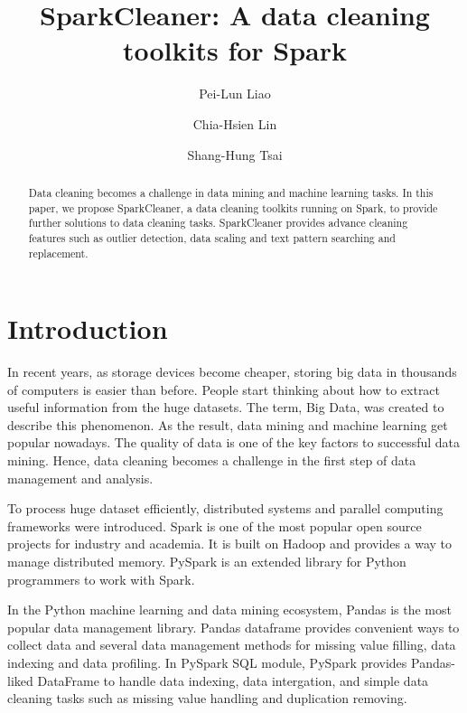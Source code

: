 \documentclass[sigconf]{acmart}
\begin{document}
\title{SparkCleaner: A data cleaning toolkits for Spark}

\author{Pei-Lun Liao}

\author{Chia-Hsien Lin}

\author{Shang-Hung Tsai}

\begin{abstract}
Data cleaning becomes a challenge in data mining and machine learning tasks. In this paper, we propose SparkCleaner, a data cleaning toolkits running on Spark, to provide further solutions to data cleaning tasks. SparkCleaner provides advance cleaning features such as outlier detection, data scaling and text pattern searching and replacement.   
\end{abstract}

\maketitle

\section{Introduction}
In recent years, as storage devices become cheaper, storing big data in thousands of computers is easier than before. People start thinking about how to extract useful information from the huge datasets. The term, Big Data, was created to describe this phenomenon\cite{bigdata}. As the result, data mining\cite{Han, MMD} and machine learning\cite{ml} get popular nowadays. The quality of data is one of the key factors to successful data mining\cite{dataquality}. Hence, data cleaning becomes a challenge in the first step of data management and analysis\cite{datacleaning, DBS-045, PW}.
	
To process huge dataset efficiently, distributed systems and parallel computing frameworks\cite{mapreduce, gfs, hadoop} were introduced. Spark\cite{spark} is one of the most popular open source projects for industry and academia. It is built on Hadoop\cite{hadoop} and provides a way to manage distributed memory. PySpark\cite{pyspark} is an extended library for Python programmers to work with Spark.
	
In the Python machine learning and data mining ecosystem, Pandas\cite{pandas} is the most popular data management library. Pandas dataframe provides convenient ways to collect data and several data management methods for missing value filling, data indexing and data profiling. In PySpark SQL module, PySpark provides Pandas-liked DataFrame to handle data indexing, data intergation, and simple data cleaning tasks such as missing value handling and duplication removing.
	
\end{document}
